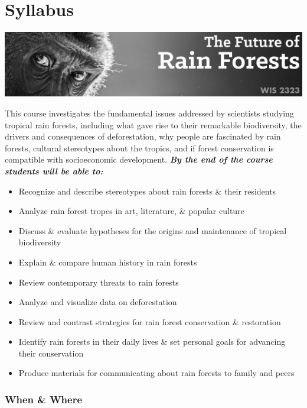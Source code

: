 \documentclass[
  10pt,
  letterpaper,
  oneside,
  open=any]{scrbook}
\author{}
\date{}
\providecommand{\tightlist}{%
  \setlength{\itemsep}{0pt}\setlength{\parskip}{0pt}}\usepackage{longtable,booktabs,array}
\begin{document}
\frontmatter

\mainmatter
{}

\chapter{Syllabus}\label{syllabus}

\includegraphics{images/banner.png}

This course investigates the fundamental issues addressed by scientists
studying tropical rain forests, including what gave rise to their
remarkable biodiversity, the drivers and consequences of deforestation,
why people are fascinated by rain forests, cultural stereotypes about
the tropics, and if forest conservation is compatible with socioeconomic
development. \textbf{\emph{By the end of the course students will be
able to:}}

\begin{itemize}
\tightlist
\item
  Recognize and describe stereotypes about rain forests \& their
  residents
\item
  Analyze rain forest tropes in art, literature, \& popular culture
\item
  Discuss \& evaluate hypotheses for the origins and maintenance of
  tropical biodiversity
\item
  Explain \& compare human history in rain forests
\item
  Review contemporary threats to rain forests
\item
  Analyze and visualize data on deforestation
\item
  Review and contrast strategies for rain forest conservation \&
  restoration
\item
  Identify rain forests in their daily lives \& set personal goals for
  advancing their conservation
\item
  Produce materials for communicating about rain forests to family and
  peers
\end{itemize}

\subsection*{When \& Where}\label{when-where}
\end{document}
